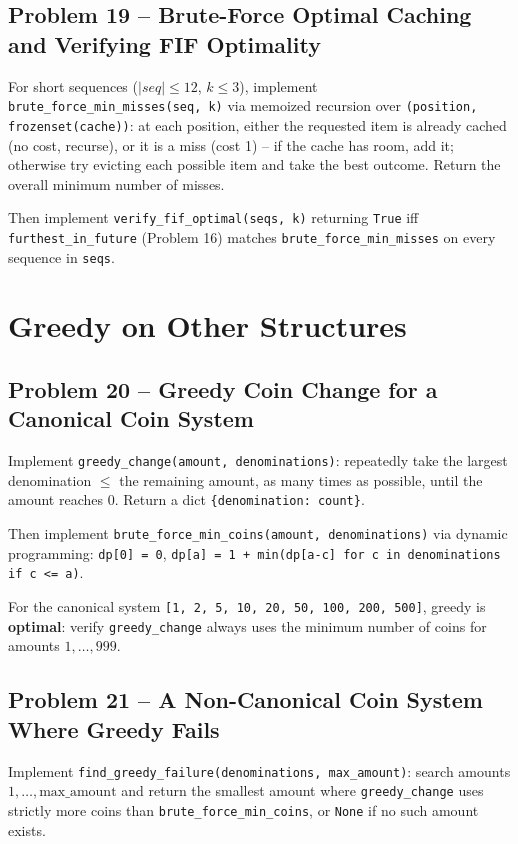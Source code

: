 \documentclass[11pt]{article}
\begin{document}
\subsection*{Problem 19 -- Brute-Force Optimal Caching and Verifying FIF Optimality}

For short sequences ($|seq| \le 12$, $k \le 3$), implement
\texttt{brute\_force\_min\_misses(seq, k)} via memoized recursion over
\texttt{(position, frozenset(cache))}: at each position, either the requested item is
already cached (no cost, recurse), or it is a miss (cost 1) -- if the cache has room, add
it; otherwise try evicting each possible item and take the best outcome. Return the
overall minimum number of misses.

Then implement \texttt{verify\_fif\_optimal(seqs, k)} returning \texttt{True} iff
\texttt{furthest\_in\_future} (Problem 16) matches \texttt{brute\_force\_min\_misses} on
every sequence in \texttt{seqs}.

\newpage
\section{Greedy on Other Structures}

\subsection*{Problem 20 -- Greedy Coin Change for a Canonical Coin System}

Implement \texttt{greedy\_change(amount, denominations)}: repeatedly take the largest
denomination $\le$ the remaining amount, as many times as possible, until the amount
reaches 0. Return a dict \texttt{\{denomination: count\}}.

Then implement \texttt{brute\_force\_min\_coins(amount, denominations)} via dynamic
programming: \texttt{dp[0] = 0}, \texttt{dp[a] = 1 + min(dp[a-c] for c in denominations if
c <= a)}.

For the canonical system \texttt{[1, 2, 5, 10, 20, 50, 100, 200, 500]}, greedy is
\textbf{optimal}: verify \texttt{greedy\_change} always uses the minimum number of coins
for amounts $1, \ldots, 999$.

\subsection*{Problem 21 -- A Non-Canonical Coin System Where Greedy Fails}

Implement \texttt{find\_greedy\_failure(denominations, max\_amount)}: search amounts $1,
\ldots, \text{max\_amount}$ and return the smallest amount where \texttt{greedy\_change}
uses strictly more coins than \texttt{brute\_force\_min\_coins}, or \texttt{None} if no
such amount exists.
\end{document}
